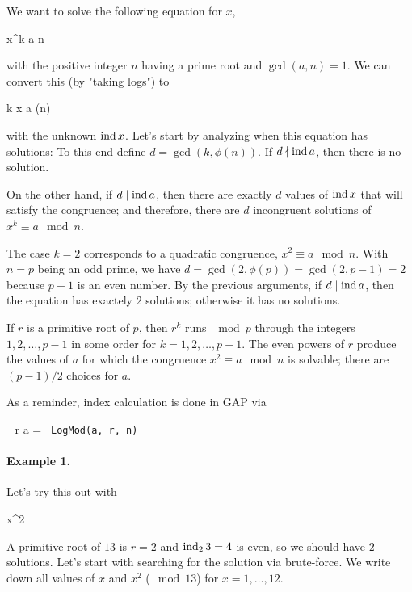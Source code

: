 
We want to solve the following equation for $x$,

\bee
x^k \equiv a \mod n
\eee

with the positive integer $n$ having a prime root and $\gcd(a,n) =1$. We can convert this (by "taking logs") to

\bee
k \ind x \equiv \ind a \mod \phi(n)
\eee

with the unknown $\operatorname{ind} x$. Let's start by analyzing when this equation has solutions: To this end define $d = \gcd(k, \phi(n))$. If $d \nmid \operatorname{ind} a$, then there is no solution.


On the other hand, if $d \mid \operatorname{ind} a$, then there are exactly $d$ values of $\operatorname{ind} x$ that will satisfy the congruence; and therefore, there are $d$ incongruent solutions of $x^k \equiv a \mod n$.

The case $k = 2$ corresponds to a quadratic congruence, $x^2 \equiv a \mod n$. With $n=p$ being an odd prime, we have $d = \gcd(2, \phi(p)) = \gcd(2, p-1) = 2$ because $p-1$ is an even number. By the previous arguments, if $d \mid \operatorname{ind} a$, then the equation has exactely $2$ solutions; otherwise it has no solutions.

If $r$ is a primitive root of $p$, then $r^k$ runs $\mod p$ through the integers $1,2,\ldots,p-1$ in some order for $k=1,2,\ldots,p-1$. The even powers of $r$ produce the values of $a$ for which the congruence $x^2 \equiv a \mod n$ is solvable; there are $(p-1)/2$ choices for $a$.

As a reminder, index calculation is done in GAP via

\bee
  \ind_r a = \verb+ LogMod(a, r, n) +
\eee


\paragraph{Example 1.} Let's try this out with

\bee
x^2  
\eee

A primitive root of $13$ is $r = 2$ and $\operatorname{ind}_2 3 = 4$ is even, so we should have $2$ solutions. Let's start with searching for the solution via brute-force. We write down all values of $x$ and $x^2$ ($\mod 13$) for $x=1,\ldots,12$.

\vspace{2mm}

